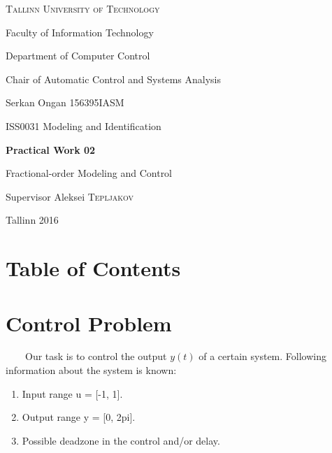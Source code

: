 \documentclass[12pt,a4paper]{article}
\author{Serkan Ongan}
\begin{document}
\begin{titlepage}
	\centering
	{\scshape\Large Tallinn University of Technology \par}
	Faculty of Information Technology \par
	Department of Computer Control \par
	Chair of Automatic Control and Systems Analysis \par
	
	\vspace{4cm}
	
	Serkan Ongan 156395IASM \par
	{\large ISS0031 Modeling and Identification \par}
	{\Large\bfseries Practical Work 02\par}
	Fractional-order Modeling and Control \par
	
	\vspace{3cm}

	\begin{flushright}
	Supervisor  Aleksei \textsc{Tepljakov} \par
	\end{flushright}

	\vfill
	{Tallinn 2016 \par}
\end{titlepage}

\pagebreak

\section*{Table of Contents}

\tableofcontents

\pagebreak

\listoffigures

\pagebreak

\section{Control Problem}

\ \ \ \ Our task is to control the output $y(t)$ of a certain system. Following information about the system is known:

\begin{enumerate}
\item Input range u = [-1, 1].
\item Output range y = [0, 2pi].
\item Possible deadzone in the control and/or delay.
\end{enumerate}
\end{document}
